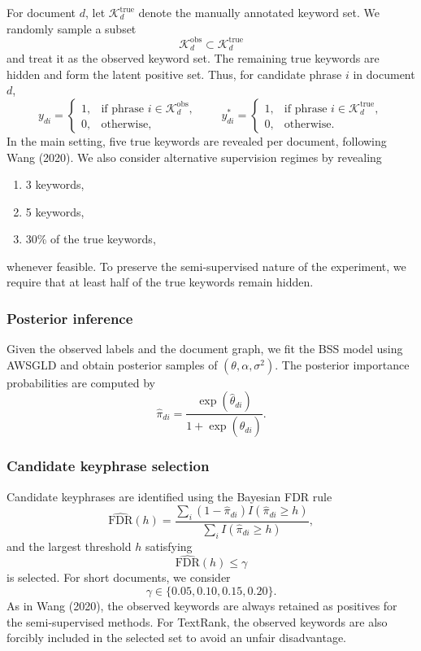 \documentclass[11pt]{article}
\begin{document}
For document $d$, let $\mathcal{K}_d^{\mathrm{true}}$ denote the manually annotated keyword set. We randomly sample a subset
\[
\mathcal{K}_d^{\mathrm{obs}} \subset \mathcal{K}_d^{\mathrm{true}}
\]
and treat it as the observed keyword set. The remaining true keywords are hidden and form the latent positive set. Thus, for candidate phrase $i$ in document $d$,
\[
y_{di}=
\begin{cases}
1, & \text{if phrase } i\in\mathcal{K}_d^{\mathrm{obs}},\\
0, & \text{otherwise},
\end{cases}
\qquad
y_{di}^*=
\begin{cases}
1, & \text{if phrase } i\in\mathcal{K}_d^{\mathrm{true}},\\
0, & \text{otherwise}.
\end{cases}
\]
In the main setting, five true keywords are revealed per document, following Wang (2020). We also consider alternative supervision regimes by revealing
\begin{enumerate}
    \item 3 keywords,
    \item 5 keywords,
    \item 30\% of the true keywords,
\end{enumerate}
whenever feasible. To preserve the semi-supervised nature of the experiment, we require that at least half of the true keywords remain hidden.

\subsubsection{Posterior inference}

Given the observed labels and the document graph, we fit the BSS model using AWSGLD and obtain posterior samples of $(\theta,\alpha,\sigma^2)$. The posterior importance probabilities are computed by
\[
\hat{\pi}_{di}=\frac{\exp(\hat{\theta}_{di})}{1+\exp(\hat{\theta}_{di})}.
\]

\subsubsection{Candidate keyphrase selection}

Candidate keyphrases are identified using the Bayesian FDR rule
\[
\widehat{\mathrm{FDR}}(h)
=
\frac{\sum_i(1-\hat{\pi}_{di})I(\hat{\pi}_{di}\ge h)}
{\sum_i I(\hat{\pi}_{di}\ge h)},
\]
and the largest threshold $h$ satisfying
\[
\widehat{\mathrm{FDR}}(h)\le \gamma
\]
is selected. For short documents, we consider
\[
\gamma \in \{0.05, 0.10, 0.15, 0.20\}.
\]
As in Wang (2020), the observed keywords are always retained as positives for the semi-supervised methods. For TextRank, the observed keywords are also forcibly included in the selected set to avoid an unfair disadvantage.
\end{document}
